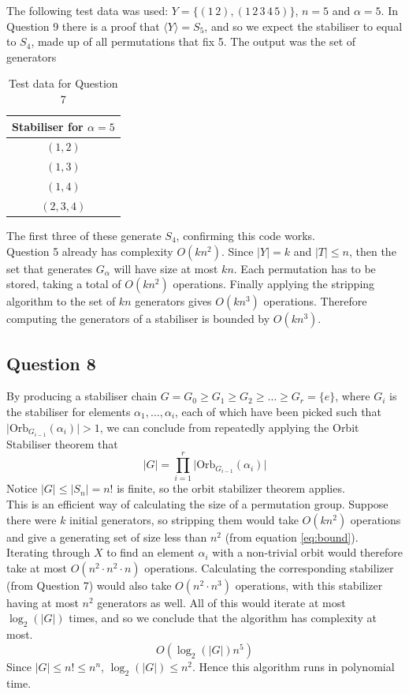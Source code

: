 \documentclass[10pt,a4paper,notitlepage]{article}
\newcommand{\abs}[1]{\lvert#1\rvert}
\newcommand{\Orb}{\text{Orb}}
\begin{document}
The following test data was used: $Y=\lbrace (1 \, 2), (1 \, 2 \, 3 \, 4 \, 5)\rbrace$, $n=5$ and $\alpha=5$. In Question 9 there is a proof that $\langle Y \rangle=S_{5}$, and so we expect the stabiliser to equal to $S_{4}$, made up of all permutations that fix 5. The output was the set of generators 
\begin{table}[H]
\centering
\begin{tabular}{|c|}
\hline Stabiliser for $\alpha=5$ \\
\hline $(1,2)$\\
$(1,3)$\\
$(1,4)$\\
$(2,3,4)$\\
\hline
\end{tabular}
\caption{Test data for Question 7}
\end{table}
The first three of these generate $S_{4}$, confirming this code works. \\
Question 5 already has complexity $O(kn^{2})$.  Since $\abs{Y}=k$ and $\abs{T}\leq n$, then the set that generates $G_{\alpha}$ will have size at most $kn$. Each permutation has to be stored, taking a total of $O(kn^{2})$ operations. Finally applying the stripping algorithm to the set of $kn$ generators gives $O(kn^{3})$ operations. Therefore computing the generators of a stabiliser is bounded by $O(kn^{3})$.

\subsection*{\centering Question 8}
By producing a stabiliser chain $G=G_{0}\geq G_{1}\geq G_{2}\geq \hdots \geq G_{r}=\lbrace e\rbrace$, where $G_{i}$ is the stabiliser for elements $\alpha_{1},\hdots,\alpha_{i}$, each of which have been picked such that $\abs{\Orb_{G_{i-1}}(\alpha_{i})}> 1$, we can conclude from repeatedly applying the Orbit Stabiliser theorem that
\begin{equation}
\abs{G}=\prod_{i=1}^{r}\abs{\Orb_{G_{i-1}}(\alpha_{i})}
\end{equation}
Notice $\abs{G}\leq \abs{S_{n}}=n!$ is finite, so the orbit stabilizer theorem applies. \\

This is an efficient way of calculating the size of a permutation group. Suppose there were $k$ initial generators, so stripping them would take $O(kn^{2})$ operations and give a generating set of size less than $n^{2}$ (from equation \eqref{eq:bound}). Iterating through $X$ to find an element $\alpha_{i}$ with a non-trivial orbit would therefore take at most $O(n^{2}\cdot n^{2}\cdot n)$ operations. Calculating the corresponding stabilizer (from Question 7) would also take $O(n^{2}\cdot n^{3})$ operations, with this stabilizer having at most $n^{2}$ generators as well. All of this would iterate at most $\log_{2}\left(\abs{G}\right)$ times, and so we conclude that the algorithm has complexity at most.
\begin{equation}
O\left(\log_{2}\left(\abs{G}\right)n^{5}\right)
\end{equation}
Since $\abs{G}\leq n!\leq n^{n}$, $\log_{2}\left(\abs{G}\right)\leq n^{2}$. Hence this algorithm runs in polynomial time.\\
\end{document}
